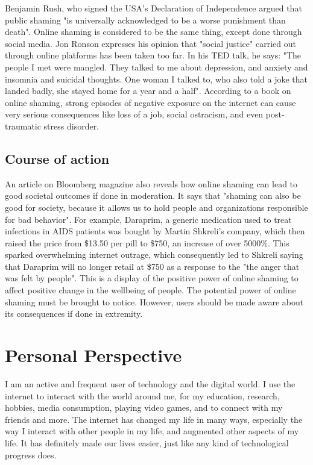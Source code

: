 \documentclass[a4paper, 11pt]{article}
\begin{document}
    Benjamin Rush, who signed the USA's Declaration of Independence argued that public shaming "is universally acknowledged to be a worse punishment than death". Online shaming is considered to be the same thing, except done through social media. Jon Ronson expresses his opinion that "social justice" carried out through online platforms has been taken too far. In his TED talk, he says: "The people I met were mangled. They talked to me about depression, and anxiety and insomnia and suicidal thoughts. One woman I talked to, who also told a joke that landed badly, she stayed home for a year and a half".\cite{jon-ronson-ted-talk} According to a book on online shaming, strong episodes of negative exposure on the internet can cause very serious consequences like loss of a job, social ostracism, and even post-traumatic stress disorder.\cite{shame-nation-book}

  \subsection{Course of action}

    An article on Bloomberg magazine also reveals how online shaming can lead to good societal outcomes if done in moderation.\cite{bloomberg-online-shaming} It says that "shaming can also be good for society, because it allows us to hold people and organizations responsible for bad behavior". For example, Daraprim, a generic medication used to treat infections in AIDS patients was bought by Martin Shkreli's company, which then raised the price from \$13.50 per pill to \$750, an increase of over 5000\%.\cite{washington-martin} This sparked overwhelming internet outrage, which consequently led to Shkreli saying that Daraprim will no longer retail at \$750 as a response to the "the anger that was felt by people". This is a display of the positive power of online shaming to affect positive change in the wellbeing of people.
    The potential power of online shaming must be brought to notice. However, users should be made aware about its consequences if done in extremity.


\section*{Personal Perspective}

  I am an active and frequent user of technology and the digital world. I use the internet to interact with the world around me, for my education, research, hobbies, media consumption, playing video games, and to connect with my friends and more. The internet has changed my life in many ways, especially the way I interact with other people in my life, and augmented other aspects of my life. It has definitely made our lives easier, just like any kind of technological progress does.
\end{document}
